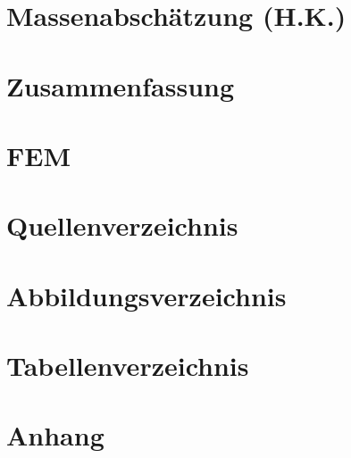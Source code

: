 \documentclass[a4paper,twoside,11pt]{article}
\begin{document}
\section{Massenabschätzung (H.K.)}

\newpage
\section{Zusammenfassung}

\newpage
\section{FEM}

\newpage
\section{Quellenverzeichnis}

\newpage
\section{Abbildungsverzeichnis}
\listoffigures
\newpage
\section{Tabellenverzeichnis}
\listoftables
\newpage
\section{Anhang}

\end{document}
